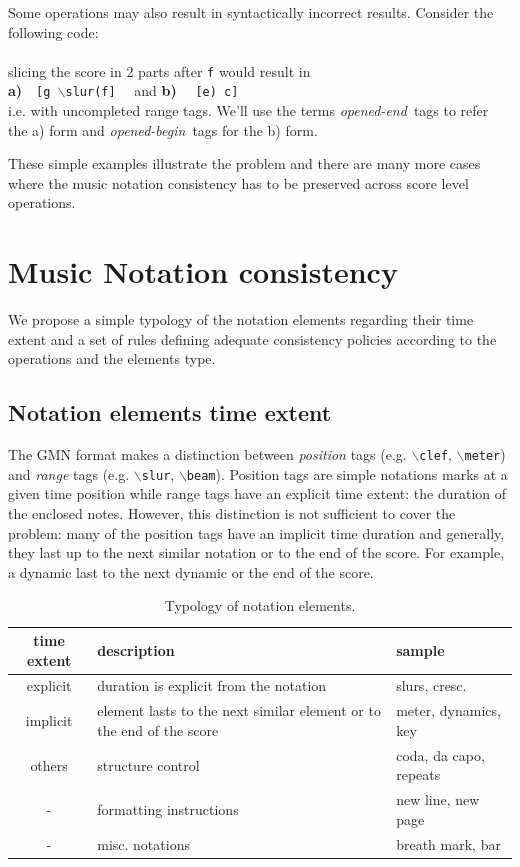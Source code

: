 \documentclass[twoside,10pt,a4paper]{article}
\newcommand{\code}[1]		{{\small \texttt{#1}}}
\newcommand{\gtag}[1]		{$\backslash$\code{#1}}
\newcommand{\oend}			{\emph{opened-end}}
\newcommand{\obeg}			{\emph{opened-begin}}
\newcommand{\codeindent}	{\\ \hspace*{9mm}}
\begin{document}
Some operations may also result in syntactically incorrect results. Consider the following code:
\codeindent \code{[g \gtag{slur}(f e) c]} \\
slicing the score in 2 parts after \code{f} would result in 
\codeindent \textbf{a)}\ \ \code{[g \gtag{slur}(f]} \ \  and \textbf{b)} \ \  \code{[e) c]} \\
i.e. with uncompleted range tags. We'll use the terms \oend\ tags to refer the a) form and \obeg\ tags for the b) form.

These simple examples illustrate the problem and there are many more cases where the music notation consistency has to be preserved across score level operations.

\section{Music Notation consistency}

We propose a simple typology of the notation elements regarding their time extent and a set of rules defining adequate consistency policies according to the operations and the elements type.

\subsection{Notation elements time extent}

The GMN format makes a distinction between \emph{position} tags (e.g. \gtag{clef}, \gtag{meter}) and \emph{range} tags (e.g. \gtag{slur}, \gtag{beam}). Position tags are simple notations marks at a given time position while range tags have an explicit time extent: the duration of the enclosed notes. 
However, this distinction is not sufficient to cover the problem: many of the position tags have an implicit time duration and generally, they last up to the next similar notation or to the end of the score. For example, a dynamic last to the next dynamic or the end of the score.
\begin{table}[htdp]
\begin{center}
\begin{tabular}{cll}
time extent & description & sample \\
\hline
explicit 	& duration is explicit from the notation	& slurs, cresc. \\
implicit 	& element lasts to the next similar element or to the end of the score		& meter, dynamics, key \\
others 		& structure control			& coda, da capo, repeats\\
	- 		& formatting instructions		& new line, new page \\
	- 		& misc. notations	& breath mark, bar \\
\hline
\end{tabular}
\end{center}
\caption{Typology of notation elements.}
\label{types}
\end{table}
\end{document}
